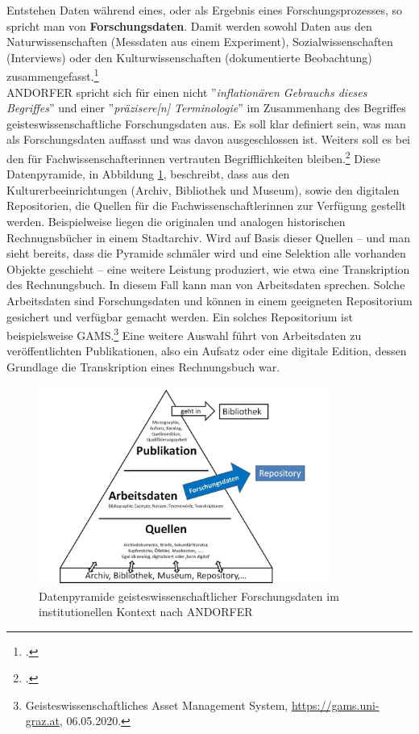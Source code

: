 \documentclass[12pt,a4paper]{article}
\begin{document}
Entstehen Daten während eines, oder als Ergebnis eines Forschungsprozesses, so spricht man von \textbf{Forschungsdaten}. Damit werden sowohl Daten aus den Naturwissenschaften (Messdaten aus einem Experiment), Sozialwissenschaften (Interviews) oder den Kulturwissenschaften (dokumentierte Beobachtung) zusammengefasst.\footcite[][09.06.2019]{kindling2013forschungsdatenmanagement}
\\
ANDORFER spricht sich für einen nicht ''\textit{inflationären Gebrauchs dieses Begriffes}'' und einer ''\textit{präzisere[n] Terminologie}'' im Zusammenhang des Begriffes geisteswissenschaftliche Forschungsdaten aus. Es soll klar definiert sein, was man als Forschungsdaten auffasst und was davon ausgeschlossen ist. Weiters soll es bei den für Fachwissenschafterinnen vertrauten Begrifflichkeiten bleiben.\footcite[][]{andorfer2015forschungsdaten}
Diese Datenpyramide, in Abbildung \ref{fig:forschungsdaten}, beschreibt, dass aus den Kulturerbeeinrichtungen (Archiv, Bibliothek und Museum), sowie den digitalen Repositorien, die Quellen für die Fachwissenschaftlerinnen zur Verfügung gestellt werden. Beispielweise liegen die originalen und analogen historischen Rechnugnsbücher in einem Stadtarchiv. Wird auf Basis dieser Quellen -- und man sieht bereits, dass die Pyramide schmäler wird und eine Selektion alle vorhanden Objekte geschieht -- eine weitere Leistung produziert, wie etwa eine Transkription des Rechnungsbuch. In diesem Fall kann man von Arbeitsdaten sprechen. Solche Arbeitsdaten sind Forschungsdaten und können in einem geeigneten Repositorium gesichert und verfügbar gemacht werden. Ein solches Repositorium ist beispielsweise GAMS.\footnote{Geisteswissenschaftliches Asset Management System, \url{https://gams.uni-graz.at}, 06.05.2020.} Eine weitere Auswahl führt von Arbeitsdaten zu veröffentlichten Publikationen, also ein Aufsatz oder eine digitale Edition, dessen Grundlage die Transkription eines Rechnungsbuch war.
\begin{figure}[H]
\centering
	\includegraphics[width=0.85\textwidth]{img/forschungsdaten.png}  
    \caption[Datenpyramide geisteswissenschaftlicher Forschungsdaten im institutionellen Kontext, ANDORFER, Peter: Forschungsdaten in den (digitalen) Geisteswissenschaften: Versuch einer Konkretisierung, 2015, S.14]{Datenpyramide geisteswissenschaftlicher Forschungsdaten im institutionellen Kontext nach ANDORFER} \label{fig:forschungsdaten}
\end{figure} 
\end{document}
